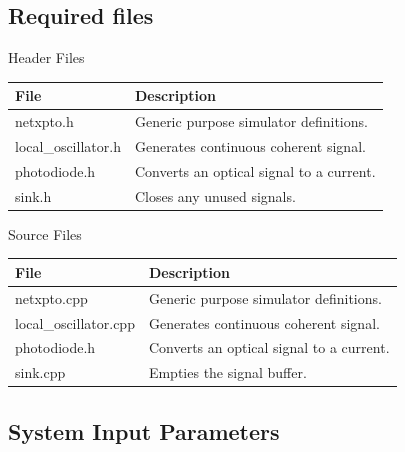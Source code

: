 \subsection*{Required files}\label{Required files}

Header Files
\begin{table}[H]
\centering
\begin{tabulary}{1.0\textwidth}{|L|L|}
\hline
\textbf{File}           & \textbf{Description}\\
\hline
netxpto.h               & Generic purpose simulator definitions.\\
\hline
local\_oscillator.h     & Generates continuous coherent signal.\\
\hline
photodiode.h            & Converts an optical signal to a current.\\
\hline
sink.h                  & Closes any unused signals.\\
\hline
\end{tabulary}
\end{table}
%
%
Source Files
\begin{table}[H]
\centering
\begin{tabulary}{1.0\textwidth}{|L|L|}
\hline
\textbf{File}                   & \textbf{Description}\\
\hline
netxpto.cpp                     & Generic purpose simulator definitions.\\
\hline
local\_oscillator.cpp           & Generates continuous coherent signal.\\
\hline
photodiode.h                    & Converts an optical signal to a current.\\
\hline
sink.cpp                        & Empties the signal buffer.\\
\hline
\end{tabulary}
\end{table}


\subsection*{System Input Parameters}

